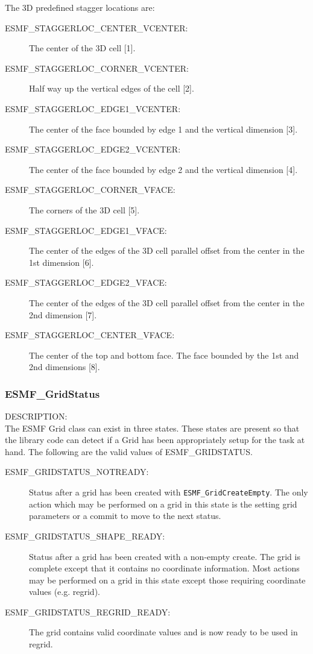 The 3D predefined stagger locations are:\\
\begin{description}
\item [ESMF\_STAGGERLOC\_CENTER\_VCENTER:] The center of the 3D cell [1].
\item [ESMF\_STAGGERLOC\_CORNER\_VCENTER:] Half way up the vertical edges of the cell [2].
\item [ESMF\_STAGGERLOC\_EDGE1\_VCENTER:] The center of the face bounded by edge 1 and the vertical dimension [3].
\item [ESMF\_STAGGERLOC\_EDGE2\_VCENTER:] The center of the face bounded by edge 2 and the vertical dimension [4]. 
\item [ESMF\_STAGGERLOC\_CORNER\_VFACE:] The corners of the 3D cell [5].
\item [ESMF\_STAGGERLOC\_EDGE1\_VFACE:] The center of the edges of the 3D cell parallel offset from the center in the 1st dimension [6].
\item [ESMF\_STAGGERLOC\_EDGE2\_VFACE:] The center of the edges of the 3D cell parallel offset from the center in the 2nd dimension [7].
\item [ESMF\_STAGGERLOC\_CENTER\_VFACE:] The center of the top and bottom face. The face bounded by the 1st and 2nd dimensions [8]. 
\end{description}


 \subsubsection{ESMF\_GridStatus}\label{sec:opt:gridstatus}

 {\sf DESCRIPTION:\\}
The ESMF Grid class can exist in three states. These states are
present so that the library code can detect if a Grid has been
appropriately setup for the task at hand. The following
are the valid values of ESMF\_GRIDSTATUS.

\medskip
\begin{description}
\item [ESMF\_GRIDSTATUS\_NOTREADY:] Status after a grid has been created with 
      {\tt ESMF\_GridCreateEmpty}. The only action which may be performed on a
      grid in this state is the setting grid parameters or a commit to move 
      to the next status. 
\item [ESMF\_GRIDSTATUS\_SHAPE\_READY:] Status after a grid has been created with 
      a non-empty create. The grid is complete except that it contains no coordinate
      information. Most actions may be performed on a grid in this state
      except those requiring coordinate values (e.g. regrid).
\item [ESMF\_GRIDSTATUS\_REGRID\_READY:] The grid contains valid coordinate
      values and is now ready to be used in regrid. 
\end{description}

